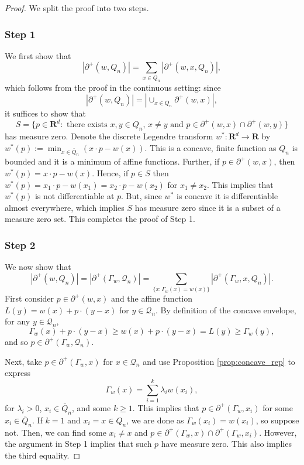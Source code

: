 \documentclass[12pt]{amsart}
\newcommand{\R}{\mathbf{R}}
\begin{document}
\begin{proof}
We split the proof into two steps.
\subsubsection*{Step 1}
We first show that 
\[
|\partial^+(w, Q_n)| = \sum_{x \in Q_n} |\partial^+(w, x, Q_n)|, 
\]
which follows from the proof in the continuous setting:
since 
\[
|\partial^+(w, Q_n)| = | \cup_{x \in Q_n} \partial^+(w, x)|, 
\]
it suffices to show that
\[
S = \{ p \in \R^d : \mbox{ there exists $x,y \in Q_n$, $x \not = y$ and $p \in \partial^+(w, x) \cap \partial^+(w, y)$} \} 
\]
has measure zero.  Denote the discrete Legendre transform $w^*: \R^d \to \R$ by  $w^*(p) := \min_{x \in \bar{Q}_n} (x \cdot p - w(x))$. This is a concave, finite function as $Q_n$ is bounded
and it is a minimum of affine functions.  Further,  if $p \in \partial^+(w, x)$, then $w^*(p) = x \cdot p - w(x)$. Hence, if $p \in S$ then $w^*(p) = x_1 \cdot p - w(x_1) = x_2 \cdot p - w(x_2)$ for $x_1 \not = x_2$. This implies that $w^*(p)$ is not differentiable at $p$. But, since $w^*$ is concave it is differentiable almost everywhere, which implies $S$ has measure zero since it is a subset of a measure zero set. This completes the proof of Step 1. 


\subsubsection*{Step 2} 
We now show that 
\[
|\partial^+(w, Q_n)| = |\partial^+(\Gamma_w, \mathcal{Q}_n)|  = \sum_{\{ x: \Gamma_w(x) = w(x) \}}  |\partial^+(\Gamma_w, x, Q_n)|.
\]
First consider $p \in \partial^+(w, x)$ and the affine function $L(y) = w(x) + p \cdot(y-x)$ for $y \in \mathcal{Q}_n$. By definition of the concave envelope, for any $y \in \mathcal{Q}_n$, 
\[
\Gamma_w(x) + p \cdot (y-x) \geq w(x) + p \cdot(y-x) = L(y) \geq \Gamma_w(y),
\]
and so $p \in \partial^+(\Gamma_w, \mathcal{Q}_n)$.

Next, take $p \in \partial^+(\Gamma_w, x)$ for $x \in \mathcal{Q}_n$ and use Proposition \ref{prop:concave_rep} to express 
\[
\Gamma_w(x)  = \sum_{i=1}^{k} \lambda_i w(x_i), 
\] 
for $\lambda_i > 0$, $x_i \in \bar{Q}_n$, and some $k \geq 1$. This implies that $p \in \partial^+(\Gamma_w, x_i)$ for some $x_i \in \bar{Q}_n$. If $k = 1$ and $x_i = x \in Q_n$, we are done as $\Gamma_w(x_i) = w(x_i)$, so suppose not.  Then, we can find some $x_i \not = x$ and $p \in \partial^+(\Gamma_w, x) \cap \partial^+(\Gamma_w, x_i)$. 
However, the argument in Step 1 implies that such $p$ have measure zero. This also implies the third equality. 





\end{proof}
\end{document}
